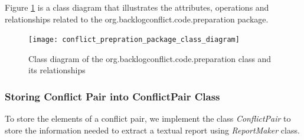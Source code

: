 Figure \ref{fig:conflict_prepration_package_class_diagram} is a class diagram that illustrates the attributes, operations and relationships related to the org.backlogconflict.code.preparation package.
\begin{figure}[h]
	\centering
	\texttt{[image: conflict\_prepration\_package\_class\_diagram]}
	\caption{Class diagram of the org.backlogconflict.code.preparation class and its relationships}\label{fig:conflict_prepration_package_class_diagram}
\end{figure}
\subsubsection*{Storing Conflict Pair into ConflictPair Class}
To store the elements of a conflict pair, we implement the class \textit{ConflictPair} to store the information needed to extract a textual report using \textit{ReportMaker} class.

